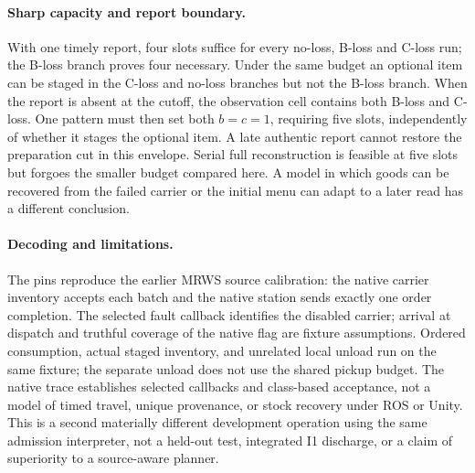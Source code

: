 \documentclass{article}
\begin{document}
\paragraph{Sharp capacity and report boundary.}
With one timely report, four slots suffice for every no-loss, B-loss and C-loss run; the B-loss branch proves four necessary. Under the same budget an optional item can be staged in the C-loss and no-loss branches but not the B-loss branch. When the report is absent at the cutoff, the observation cell contains both B-loss and C-loss. One pattern must then set both \(b=c=1\), requiring five slots, independently of whether it stages the optional item. A late authentic report cannot restore the preparation cut in this envelope. Serial full reconstruction is feasible at five slots but forgoes the smaller budget compared here. A model in which goods can be recovered from the failed carrier or the initial menu can adapt to a later read has a different conclusion.

\paragraph{Decoding and limitations.}
The pins reproduce the earlier MRWS source calibration: the native carrier inventory accepts each batch and the native station sends exactly one order completion. The selected fault callback identifies the disabled carrier; arrival at dispatch and truthful coverage of the native flag are fixture assumptions. Ordered consumption, actual staged inventory, and unrelated local unload run on the same fixture; the separate unload does not use the shared pickup budget. The native trace establishes selected callbacks and class-based acceptance, not a model of timed travel, unique provenance, or stock recovery under ROS or Unity. This is a second materially different development operation using the same admission interpreter, not a held-out test, integrated I1 discharge, or a claim of superiority to a source-aware planner.
\end{document}
